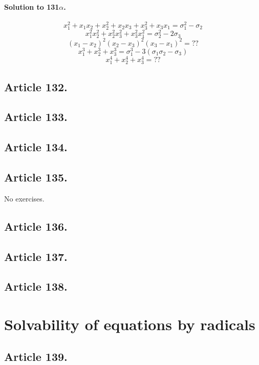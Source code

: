 \paragraph*{Solution to 131$\alpha$.}

$$x_1^2 + x_1 x_2 + x_2^2 + x_2 x_3 + x_3^2 + x_3 x_1 = \sigma_1^2 - \sigma_2$$
$$x_1^2 x_2^2 + x_2^2 x_3^2 + x_3^2 x_1^2 = \sigma_2^2 - 2\sigma_3$$
$$(x_1-x_2)^2 (x_2-x_3)^2 (x_3-x_1)^2 = ??$$
$$x_1^3 + x_2^3 + x_3^3 = \sigma_1^3 - 3(\sigma_1 \sigma_2 - \sigma_3)$$
$$x_1^4 + x_2^4 + x_3^4 = ??$$
\subsection{Article 132.}

\subsection{Article 133.}

\subsection{Article 134.}

\subsection{Article 135.}

No exercises.
\subsection{Article 136.}

\subsection{Article 137.}

\subsection{Article 138.}


\section{Solvability of equations by radicals}


\subsection{Article 139.}

